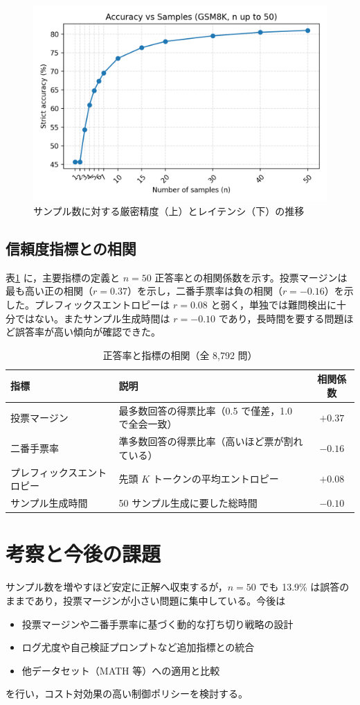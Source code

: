 \documentclass{ipsj}
\begin{document}
\begin{figure}[h]
  \centering
  \includegraphics[width=0.8\linewidth]{../../figures/n50_batch/accuracy_vs_n50.png}
  \caption{サンプル数に対する厳密精度（上）とレイテンシ（下）の推移}
  \label{fig:accuracy_curve}
\end{figure}

\subsection{信頼度指標との相関}
表\ref{tab:correlation} に，主要指標の定義と $n=50$ 正答率との相関係数を示す。投票マージンは最も高い正の相関（$r=0.37$）を示し，二番手票率は負の相関（$r=-0.16$）を示した。プレフィックスエントロピーは $r=0.08$ と弱く，単独では難問検出に十分ではない。またサンプル生成時間は $r=-0.10$ であり，長時間を要する問題ほど誤答率が高い傾向が確認できた。

\begin{table}[h]
  \centering
  \caption{正答率と指標の相関（全 8,792 問）}
  \label{tab:correlation}
  \begin{tabular}{@{}p{3cm}p{6cm}c@{}}
    \toprule
    指標 & 説明 & 相関係数 \\
    \midrule
    投票マージン & 最多数回答の得票比率（0.5 で僅差，1.0 で全会一致） & $+0.37$ \\
    二番手票率 & 準多数回答の得票比率（高いほど票が割れている） & $-0.16$ \\
    プレフィックスエントロピー & 先頭 $K$ トークンの平均エントロピー & $+0.08$ \\
    サンプル生成時間 & 50 サンプル生成に要した総時間 & $-0.10$ \\
  \bottomrule
  \end{tabular}
\end{table}

\section{考察と今後の課題}
サンプル数を増やすほど安定に正解へ収束するが，$n=50$ でも 13.9\% は誤答のままであり，投票マージンが小さい問題に集中している。今後は
\begin{itemize}
  \item 投票マージンや二番手票率に基づく動的な打ち切り戦略の設計
  \item ログ尤度や自己検証プロンプトなど追加指標との統合
  \item 他データセット（MATH 等）への適用と比較
\end{itemize}
を行い，コスト対効果の高い制御ポリシーを検討する。
\end{document}
